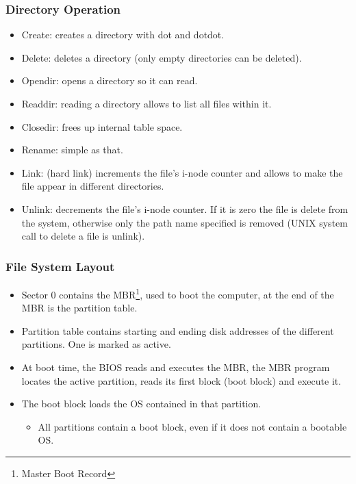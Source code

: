 \begin{frame}
  \frametitle{Directory Operation}
    \begin{itemize}
      \item Create: creates a directory with dot and dotdot.
      \item Delete: deletes a directory (only empty directories can be deleted).
      \item Opendir: opens a directory so it can read.
      \item Readdir: reading a directory allows to list all files within it.
      \item Closedir: frees up internal table space.
      \item Rename: simple as that.
      \item Link: (hard link) increments the file's i-node counter and allows to make the file appear in different directories.
      \item Unlink: decrements the file's i-node counter. If it is zero the file is delete from the system, otherwise only the path name specified is removed (UNIX system call to delete a file is unlink).
    \end{itemize}
\end{frame}

\begin{frame}
  \frametitle{File System Layout}
    \begin{itemize}
      \item Sector 0 contains the MBR\footnote{Master Boot Record}, used to boot the computer, at the end of the MBR is the partition table.
      \item Partition table contains starting and ending disk addresses of the different partitions. One is marked as active.
      \item At boot time, the BIOS reads and executes the MBR, the MBR program locates the active partition, reads its first block (boot block) and execute it.
      \item The boot block loads the OS contained in that partition.
        \begin{itemize}
          \item All partitions contain a boot block, even if it does not contain a bootable OS.
        \end{itemize}
  \end{itemize}
\end{frame}

